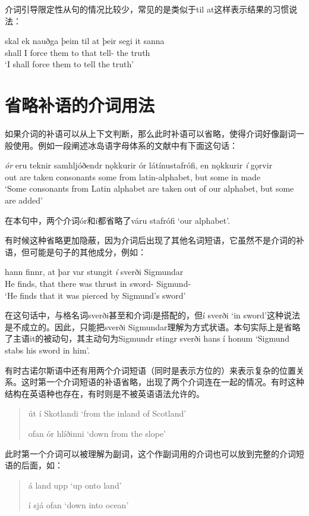 介词引导限定性从句的情况比较少，常见的是类似于til at这样表示结果的习惯说法：
\begin{exe}
    \ex \gll
    skal ek nauðga þeim til at þeir segi it sanna\\
    shall I force them to that tell-{\sub} the truth\\
    \trans `I shall force them to tell the truth'
\end{exe}

\section{省略补语的介词用法}
如果介词的补语可以从上下文判断，那么此时补语可以省略，使得介词好像副词一般使用。例如一段阐述冰岛语字母体系的文献中有下面这句话：
\begin{exe}
    \ex \gll
    \textit{ór} eru teknir samhljóðendr nǫkkurir ór látínustafrófi, en nǫkkurir \textit{í} gǫrvir\\
    out are taken consonants some from latin-alphabet, but some in made\\
    \trans `Some consonants from Latin alphabet are taken out of our alphabet, but some are added'
\end{exe}

在本句中，两个介词ór和í都省略了váru stafrófi `our alphabet'.

有时候这种省略更加隐蔽，因为介词后出现了其他名词短语，它虽然不是介词的补语，但可能是句子的其他成分，例如：
\begin{exe}
    \ex \gll
    hann finnr, at þar var stungit \textit{í} sverði Sigmundar\\
    He finds, that there was thrust in sword-{\dat} Sigmund-{\gen}\\
    \trans `He finds that it was pierced by Sigmund's sword'
\end{exe}

在这句话中，与格名词sverði甚至和介词í是搭配的，但í sverði `in sword'这种说法是不成立的。因此，只能把sverði Sigmundar理解为方式状语。本句实际上是省略了主语it的被动句，其主动句为Sigmundr stingr sverði hans í honum `Sigmund stabs his sword in him'.

有时古诺尔斯语中还有用两个介词短语（同时是表示方位的）来表示复杂的位置关系。这时第一个介词短语的补语省略，出现了两个介词连在一起的情况。有时这种结构在英语种也存在，有时则是不被英语语法允许的。
\begin{quote}
    út í Skotlandi `from the inland of Scotland'

    ofan ór hlíðinni `down from the slope'
\end{quote}

此时第一个介词可以被理解为副词，这个作副词用的介词也可以放到完整的介词短语的后面，如：
\begin{quote}
    á land upp `up onto land'

    í sjá ofan `down into ocean'
\end{quote}



